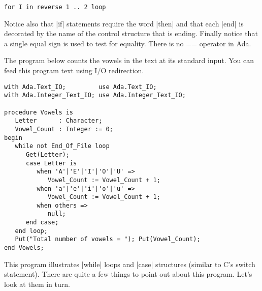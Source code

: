 \begin{lstlisting}
for I in reverse 1 .. 2 loop
\end{lstlisting}

Notice also that |if| statements require the word |then| and that each |end| is decorated by the
name of the control structure that is ending. Finally notice that a single equal sign is used to
test for equality. There is no == operator in Ada.

The program below counts the vowels in the text at its standard input. You can feed this program
text using I/O redirection.

\begin{lstlisting}
with Ada.Text_IO;         use Ada.Text_IO;
with Ada.Integer_Text_IO; use Ada.Integer_Text_IO;

procedure Vowels is
   Letter      : Character;
   Vowel_Count : Integer := 0;
begin
   while not End_Of_File loop
      Get(Letter);
      case Letter is
         when 'A'|'E'|'I'|'O'|'U' =>
            Vowel_Count := Vowel_Count + 1;
         when 'a'|'e'|'i'|'o'|'u' =>
            Vowel_Count := Vowel_Count + 1;
         when others =>
            null;
      end case;
   end loop;
   Put("Total number of vowels = "); Put(Vowel_Count);
end Vowels;
\end{lstlisting}

\noindent This program illustrates |while| loops and |case| structures (similar to C's switch
statement). There are quite a few things to point out about this program. Let's look at them in
turn.

